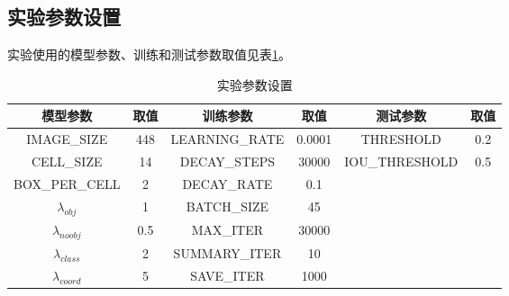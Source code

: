 \subsection{实验参数设置}
实验使用的模型参数、训练和测试参数取值见表\ref{tab:3_3_params}。
\begin{table}[htbp]
	\centering
	\caption{实验参数设置} \label{tab:3_3_params}
	\begin{small} %
		\begin{tabular}{|c|c|c|c|c|c|}\hline
			模型参数                   & 取值  & 训练参数              & 取值       & 测试参数   & 取值 \\\hline
			IMAGE\_SIZE            & 448   &  LEARNING\_RATE & 0.0001   & THRESHOLD & 0.2 \\
			CELL\_SIZE               & 14     &  DECAY\_STEPS     & 30000    & IOU\_THRESHOLD & 0.5 \\
			BOX\_PER\_CELL       & 2       &  DECAY\_RATE      & 0.1         & & \\
			$\lambda_{obj}$        & 1       &  BATCH\_SIZE       & 45          & & \\
			$\lambda_{noobj}$    & 0.5    &  MAX\_ITER           & 30000    & & \\
			$\lambda_{class}$     & 2       &  SUMMARY\_ITER  & 10         &  & \\
			$\lambda_{coord}$    & 5       & SAVE\_ITER           & 1000      &  & \\\hline
		\end{tabular}
	\end{small} %
\end{table}

